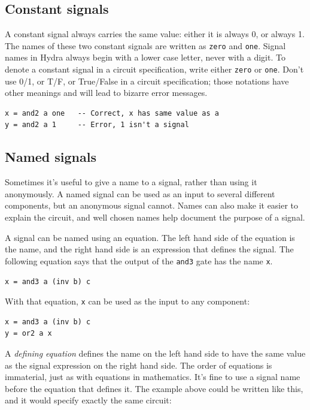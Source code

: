 \documentclass[]{svmono}
\begin{document}
\subsection*{Constant signals}
\label{sec:org60f8768}

A constant signal always carries the same value: either it is
always 0, or always 1.  The names of these two constant signals
are written as \texttt{zero} and \texttt{one}.  Signal names in Hydra always
begin with a lower case letter, never with a digit.  To denote a
constant signal in a circuit specification, write either \texttt{zero} or
\texttt{one}.  Don't use 0/1, or T/F, or True/False in a circuit
specification; those notations have other meanings and will lead
to bizarre error messages.

\begin{verbatim}
x = and2 a one   -- Correct, x has same value as a
y = and2 a 1     -- Error, 1 isn't a signal
\end{verbatim}
\subsection*{Named signals}
\label{sec:org27fec5c}

Sometimes it's useful to give a name to a signal, rather than using it
anonymously.  A named signal can be used as an input to several
different components, but an anonymous signal cannot.  Names can also
make it easier to explain the circuit, and well chosen names help
document the purpose of a signal.

A signal can be named using an equation.  The left hand side of the
equation is the name, and the right hand side is an expression that
defines the signal.  The following equation says that the output of
the \texttt{and3} gate has the name \texttt{x}.

\begin{verbatim}
x = and3 a (inv b) c
\end{verbatim}

With that equation, \texttt{x} can be used as the input to any component:

\begin{verbatim}
x = and3 a (inv b) c
y = or2 a x
\end{verbatim}

A \emph{defining equation} defines the name on the left hand side to have
the same value as the signal expression on the right hand side. The
order of equations is immaterial, just as with equations in
mathematics.  It's fine to use a signal name before the equation that
defines it.  The example above could be written like this, and it
would specify exactly the same circuit:
\end{document}
